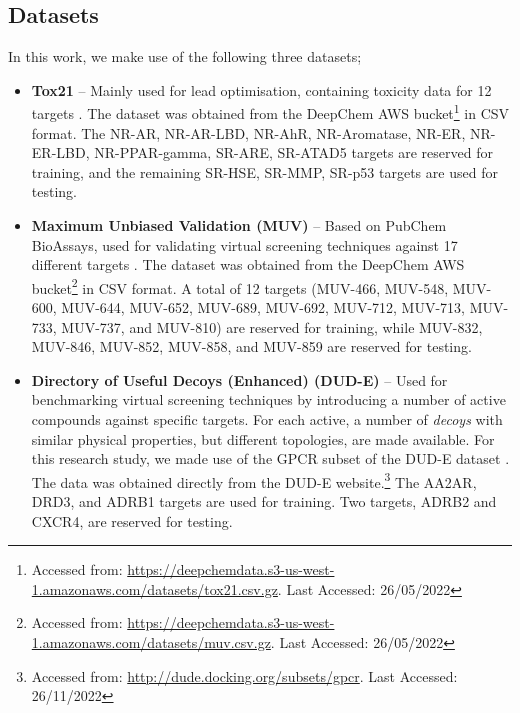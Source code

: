 \subsection{Datasets}

In this work, we make use of the following three datasets;

\begin{itemize}
    
    \item \textbf{Tox21} \citep{huang2016tox21challenge} -- Mainly used for lead optimisation, containing toxicity data for 12 targets \citep{tox21}. The dataset was obtained from the DeepChem AWS bucket\footnote{Accessed from: \url{https://deepchemdata.s3-us-west-1.amazonaws.com/datasets/tox21.csv.gz}. Last Accessed: 26/05/2022} in CSV format. The NR-AR, NR-AR-LBD, NR-AhR, NR-Aromatase, NR-ER, NR-ER-LBD, NR-PPAR-gamma, SR-ARE, SR-ATAD5 targets are reserved for training, and the remaining SR-HSE, SR-MMP, SR-p53 targets are used for testing.
    
    \item \textbf{Maximum Unbiased Validation (MUV)} \citep{rohrer2009maximum} -- Based on PubChem BioAssays, used for validating virtual screening techniques against 17 different targets \citep{rohrer2009maximum}. The dataset was obtained from the DeepChem AWS bucket\footnote{Accessed from: \url{https://deepchemdata.s3-us-west-1.amazonaws.com/datasets/muv.csv.gz}. Last Accessed: 26/05/2022} in CSV format. A total of 12 targets (MUV-466, MUV-548, MUV-600, MUV-644, MUV-652, MUV-689, MUV-692, MUV-712, MUV-713, MUV-733, MUV-737, and MUV-810) are reserved for training, while MUV-832, MUV-846, MUV-852, MUV-858, and MUV-859 are reserved for testing.
    
    \item \textbf{Directory of Useful Decoys (Enhanced) (DUD-E)} \cite{mysinger2012directory} -- Used for benchmarking virtual screening techniques by introducing a number of active compounds against specific targets. For each active, a number of \textit{decoys} with similar physical properties, but different topologies, are made available. For this research study, we made use of the GPCR subset of the DUD-E dataset \citep{mysinger2012directory}. The data was obtained directly from the DUD-E website.\footnote{Accessed from: \url{http://dude.docking.org/subsets/gpcr}. Last Accessed: 26/11/2022} The AA2AR, DRD3, and ADRB1 targets are used for training. Two targets, ADRB2 and CXCR4, are reserved for testing.
\end{itemize}

